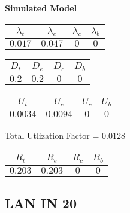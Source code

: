 \documentclass{article}
\begin{document}
\begin{minipage}{0.5\textwidth}
\centering	\textbf{Simulated Model}
\begin{table}[H]
\centering
\begin{tabular}{@{}cccc@{}}
\toprule
$\lambda_t$ & $\lambda_e$ & $\lambda_c$ & $\lambda_b$\\
\midrule
$0.017$ & $0.047$ & $0$ & $0$\\
\bottomrule
\end{tabular}
\end{table}
\begin{table}[H]
\centering
\begin{tabular}{@{}cccc@{}}
\toprule
$D_t$ & $D_e$ & $D_c$ & $D_b$\\
\midrule
$0.2$ & $0.2$ & $0$ & $0$\\
\bottomrule
\end{tabular}
\end{table}\begin{table}[H]
\centering
\begin{tabular}{@{}cccc@{}}
\toprule
$U_t$ & $U_e$ & $U_c$ & $U_b$\\
\midrule
$0.0034$ & $0.0094$ & $0$ & $0$\\
\bottomrule
\end{tabular}
\end{table}
\centering Total Utlization Factor = $0.0128$
\begin{table}[H]
\centering
\begin{tabular}{@{}cccc@{}}
\toprule
$R_t$ & $R_e$ & $R_c$ & $R_b$\\
\midrule
$0.203$ & $0.203$ & $0$ & $0$\\
\bottomrule
\end{tabular}
\end{table}
\end{minipage}\subsection{LAN IN 20}
\end{document}
